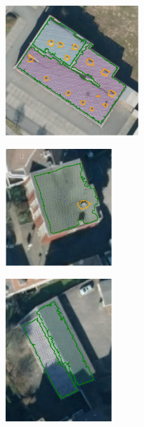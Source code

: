 \begin{figure}[ht]
  \begin{subfigure}[t]{.33\linewidth}
    \centering\includegraphics[trim=5mm 5mm 5mm 5mm, clip, width=5cm]{chapter_3_polylidar3d/imgs/rooftop/74359194_satellite.pdf}
    \caption{\label{fig:ch3_rooftop_a}}
  \end{subfigure}
  \hfill
  \begin{subfigure}[t]{.30\linewidth}
    \centering\includegraphics[trim=15mm 8mm 5mm 5mm, clip, width=4cm]{chapter_3_polylidar3d/imgs/rooftop/74200193_satellite.pdf}
    \caption{\label{fig:ch3_rooftop_b}}
  \end{subfigure}
  \hfill
  \begin{subfigure}[t]{.30\linewidth}
    \centering\includegraphics[trim=5mm 7mm 0mm 7mm, clip, width=4cm]{chapter_3_polylidar3d/imgs/rooftop/74272674_satellite.pdf}
    \caption{\label{fig:ch3_rooftop_c}}
  \end{subfigure}
    \par\bigskip
    \centering
  \begin{subfigure}[t]{.55\linewidth}

\end{subfigure}
\end{figure}
